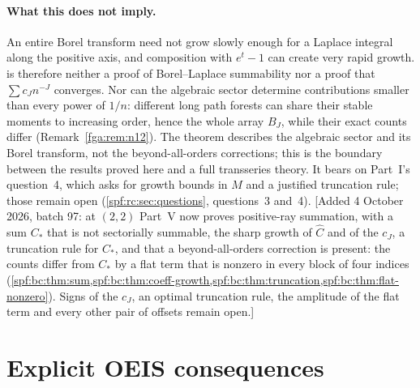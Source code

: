 \documentclass[11pt]{article}
\numberwithin{equation}{section}
\theoremstyle{definition}
\theoremstyle{remark}
\theoremstyle{definition}
\newcommand{\bcC}{C_{\!*}}
\begin{document}
\paragraph{What this does not imply.} An entire Borel transform need not
grow slowly enough for a Laplace integral along the positive axis, and
composition with $e^t-1$ can create very rapid growth. 
is therefore neither a proof of Borel--Laplace summability nor a proof that
$\sum c_Jn^{-J}$ converges. Nor can the algebraic sector determine
contributions smaller than every power of $1/n$: different long path forests
can share their stable moments to increasing order, hence the whole array
$B_J$, while their exact counts differ (Remark~\ref{fga:rem:n12}). The theorem
describes the algebraic sector and its Borel transform, not the
beyond-all-orders corrections; this is the boundary between the results
proved here and a full transseries theory. It bears on Part~I's question~4,
which asks for growth bounds in $M$ and a justified truncation rule; those
remain open (\cref{spf:rc:sec:questions}, questions~3 and~4).
[Added 4 October 2026, batch 97: at $(2,2)$ Part~V now proves positive-ray
summation, with a sum $\bcC$ that is not sectorially summable, the sharp
growth of $\widehat C$ and of the $c_J$, a truncation rule for $\bcC$, and
that a beyond-all-orders correction is present: the counts differ from
$\bcC$ by a flat term that is nonzero in every block of four indices
(\cref{spf:bc:thm:sum,spf:bc:thm:coeff-growth,spf:bc:thm:truncation,spf:bc:thm:flat-nonzero}).
Signs of the $c_J$, an optimal truncation rule, the amplitude of the flat
term and every other pair of offsets remain open.]

\section{Explicit OEIS consequences}
\label{spf:rc:sec:OEIS}
\end{document}
